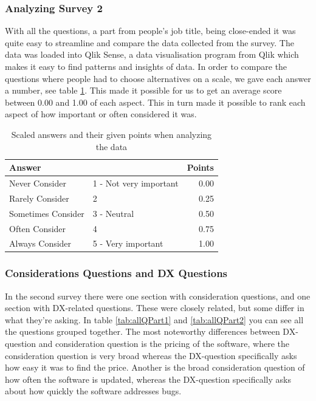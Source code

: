 \documentclass{cslthse-msc}
\begin{document}
    \subsubsection{Analyzing Survey 2}
    With all the questions, a part from people's job title, being close-ended it was quite easy to streamline and compare the data collected from the survey. The data was loaded into Qlik Sense, a data visualisation program from Qlik which makes it easy to find patterns and insights of data. In order to compare the questions where people had to choose alternatives on a scale, we gave each answer a number, see table \ref{tabl:points}.
    This made it possible for us to get an average score between 0.00 and 1.00 of each aspect. This in turn made it possible to rank each aspect of how important or often considered it was.
    \begin{table}[H]
        \caption{Scaled answers and their given points when analyzing the data}
        \label{tabl:points}
        \centering
        \begin{tabular}{l l|r}
            \multicolumn{2}{l}{\textbf{Answer}} & \textbf{Points} \\ \hline
            Never Consider & 1 - Not very important & 0.00  \\ \hline
            Rarely Consider & 2 & 0.25 \\ \hline
            Sometimes Consider & 3 - Neutral & 0.50 \\ \hline
            Often Consider & 4 & 0.75 \\ \hline
            Always Consider & 5 - Very important & 1.00 \\ \hline
        \end{tabular}
    \end{table}

    \subsubsection{Considerations Questions and DX Questions}\label{consisQuestions}
    In the second survey there were one section with consideration questions, and one section with DX-related questions. These were closely related, but some differ in what they're asking. In table \ref{tab:allQPart1} and \ref{tab:allQPart2} you can see all the questions grouped together. The most noteworthy differences between DX-question and consideration question is the pricing of the software, where the consideration question is very broad whereas the DX-question specifically asks how easy it was to find the price. Another is the broad consideration question of how often the software is updated, whereas the DX-question specifically asks about how quickly the software addresses bugs.
\end{document}
